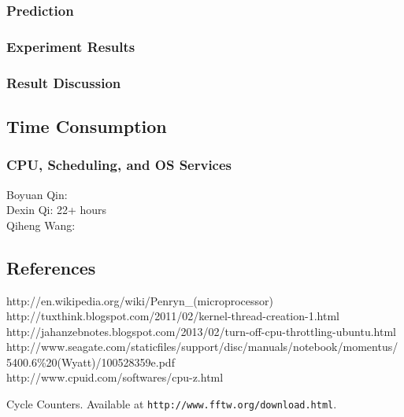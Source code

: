 \documentclass{article} %
\begin{document}
\subsubsection{Prediction}
\subsubsection{Experiment Results}
\subsubsection{Result Discussion}


\subsection{Time Consumption}
\subsubsection{CPU, Scheduling, and OS Services}
Boyuan Qin:\\
Dexin Qi: 22+ hours\\
Qiheng Wang:\\

\subsection{References}
http://en.wikipedia.org/wiki/Penryn\_(microprocessor)\\
http://tuxthink.blogspot.com/2011/02/kernel-thread-creation-1.html\\
http://jahanzebnotes.blogspot.com/2013/02/turn-off-cpu-throttling-ubuntu.html\\
http://www.seagate.com/staticfiles/support/disc/manuals/notebook/momentus/5400.6\%20(Wyatt)/100528359e.pdf\\
http://www.cpuid.com/softwares/cpu-z.html\\

\begin{thebibliography}{1}

 Cycle Counters. Available at {\tt http://www.fftw.org/download.html}.

\end{thebibliography}
\end{document}
